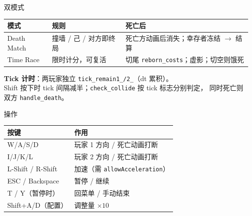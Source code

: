 \documentclass[aspectratio=169,13pt]{beamer}
\begin{document}
\begin{frame}{双模式}
  \begin{table}
    \centering
    \footnotesize
    \begin{tabular}{@{}p{2.2cm}p{4.2cm}p{5.5cm}@{}}
      \toprule
      模式 & 规则 & 死亡后 \\
      \midrule
      Death Match & 撞墙 / 己 / 对方即终局
        & 死亡方动画后消失；幸存者冻结 $\rightarrow$ 结算 \\
      Time Race & 限时计分，可复活
        & 切尾 \texttt{reborn\_costs}；虚影；切空则饿死 \\
      \bottomrule
    \end{tabular}
  \end{table}

  \vspace{0.4em}
  \textbf{Tick 计时}：两玩家独立 \texttt{tick\_remain1\_/2\_}（dt 累积）。\\
  Shift 按下时 tick 间隔减半；\texttt{check\_collide} 按 tick 标志分别判定，
  同时死亡则双方 \texttt{handle\_death}。
\end{frame}

\begin{frame}{操作}
  \begin{table}
    \centering
    \footnotesize
    \begin{tabular}{@{}ll@{}}
      \toprule
      按键 & 作用 \\
      \midrule
      W/A/S/D & 玩家 1 方向 / 死亡动画打断 \\
      I/J/K/L & 玩家 2 方向 / 死亡动画打断 \\
      L-Shift / R-Shift & 加速（需 \texttt{allowAcceleration}） \\
      ESC / Backspace & 暂停 / 继续 \\
      T / Y（暂停时） & 回菜单 / 手动结束 \\
      Shift+A/D（配置） & 调整量 $\times 10$ \\
      \bottomrule
    \end{tabular}
  \end{table}
\end{frame}
\end{document}
